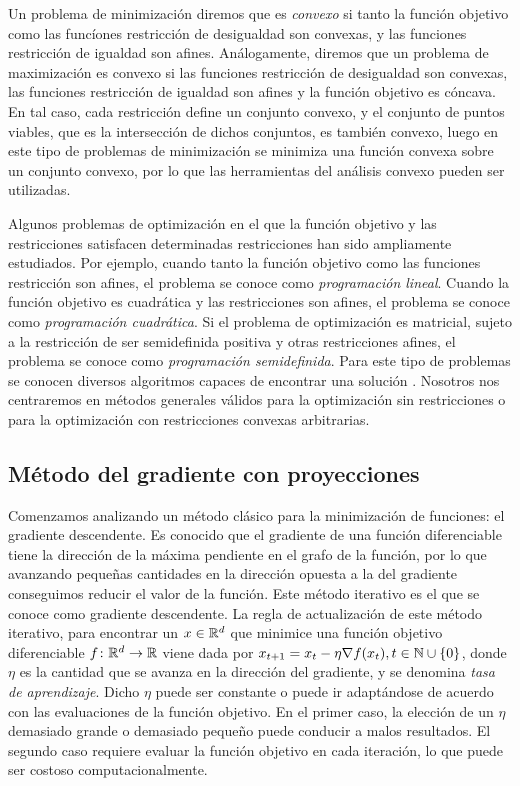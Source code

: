 \begin{definition}
    Un problema de minimización diremos que es \emph{convexo} si tanto la función objetivo como las funcíones restricción de desigualdad son convexas, y las funciones restricción de igualdad son afines. Análogamente, diremos que un problema de maximización es convexo si las funciones restricción de desigualdad son convexas, las funciones restricción de igualdad son afines y la función objetivo es cóncava. En tal caso, cada restricción define un conjunto convexo, y el conjunto de puntos viables, que es la intersección de dichos conjuntos, es también convexo, luego en este tipo de problemas de minimización se minimiza una función convexa sobre un conjunto convexo, por lo que las herramientas del análisis convexo pueden ser utilizadas.
\end{definition}

Algunos problemas de optimización en el que la función objetivo y las restricciones satisfacen determinadas restricciones han sido ampliamente estudiados. Por ejemplo, cuando tanto la función objetivo como las funciones restricción son afines, el problema se conoce como \emph{programación lineal}. Cuando la función objetivo es cuadrática y las restricciones son afines, el problema se conoce como \emph{programación cuadrática}. Si el problema de optimización es matricial, sujeto a la restricción de ser semidefinida positiva y otras restricciones afines, el problema se conoce como \emph{programación semidefinida}. Para este tipo de problemas se conocen diversos algoritmos capaces de encontrar una solución \cite{convexoptimization}. Nosotros nos centraremos en métodos generales válidos para la optimización sin restricciones o para la optimización con restricciones convexas arbitrarias.

\subsection{Método del gradiente con proyecciones}

Comenzamos analizando un método clásico para la minimización de funciones: el gradiente descendente. Es conocido que el gradiente de una función diferenciable tiene la dirección de la máxima pendiente en el grafo de la función, por lo que avanzando pequeñas cantidades en la dirección opuesta a la del gradiente conseguimos reducir el valor de la función. Este método iterativo es el que se conoce como gradiente descendente. La regla de actualización de este método iterativo, para encontrar un $x \in \mathbb{R}^d$ que minimice una función objetivo diferenciable $f \colon \mathbb{R}^d \to \mathbb{R}$ viene dada por $x_{t+1} = x_t - \eta \nabla f(x_t), t \in \mathbb{N} \cup\{0\}$, donde $\eta$ es la cantidad que se avanza en la dirección del gradiente, y se denomina \emph{tasa de aprendizaje}. Dicho $\eta$ puede ser constante o puede ir adaptándose de acuerdo con las evaluaciones de la función objetivo. En el primer caso, la elección de un $\eta$ demasiado grande o demasiado pequeño puede conducir a malos resultados. El segundo caso requiere evaluar la función objetivo en cada iteración, lo que puede ser costoso computacionalmente.

